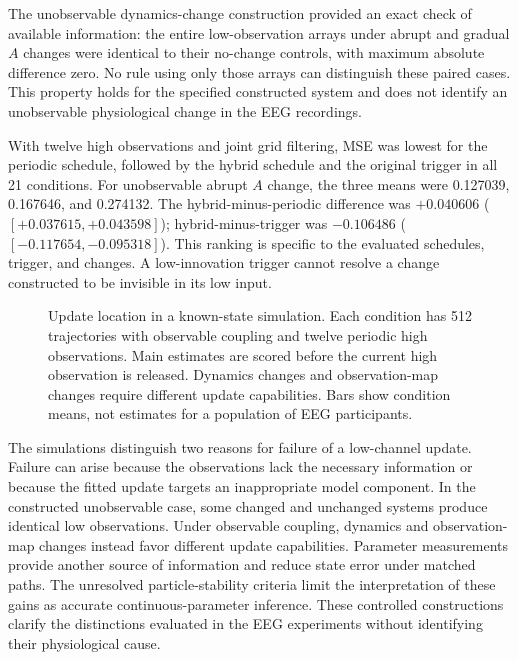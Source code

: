 \documentclass[11pt,a4paper]{article}
\begin{document}
The unobservable dynamics-change construction provided an exact check of available information: the entire low-observation arrays under abrupt and gradual $A$ changes were identical to their no-change controls, with maximum absolute difference zero. No rule using only those arrays can distinguish these paired cases. This property holds for the specified constructed system and does not identify an unobservable physiological change in the EEG recordings.

With twelve high observations and joint grid filtering, MSE was lowest for the periodic schedule, followed by the hybrid schedule and the original trigger in all 21 conditions. For unobservable abrupt $A$ change, the three means were 0.127039, 0.167646, and 0.274132. The hybrid-minus-periodic difference was $+0.040606$ ($[+0.037615,+0.043598]$); hybrid-minus-trigger was $-0.106486$ ($[-0.117654,-0.095318]$). This ranking is specific to the evaluated schedules, trigger, and changes. A low-innovation trigger cannot resolve a change constructed to be invisible in its low input.

\begin{figure}[t]
\centering
{}
\caption{Update location in a known-state simulation. Each condition has 512 trajectories with observable coupling and twelve periodic high observations. Main estimates are scored before the current high observation is released. Dynamics changes and observation-map changes require different update capabilities. Bars show condition means, not estimates for a population of EEG participants.}
\label{fig:layers}
\end{figure}

The simulations distinguish two reasons for failure of a low-channel update. Failure can arise because the observations lack the necessary information or because the fitted update targets an inappropriate model component. In the constructed unobservable case, some changed and unchanged systems produce identical low observations. Under observable coupling, dynamics and observation-map changes instead favor different update capabilities. Parameter measurements provide another source of information and reduce state error under matched paths. The unresolved particle-stability criteria limit the interpretation of these gains as accurate continuous-parameter inference. These controlled constructions clarify the distinctions evaluated in the EEG experiments without identifying their physiological cause.
\end{document}
